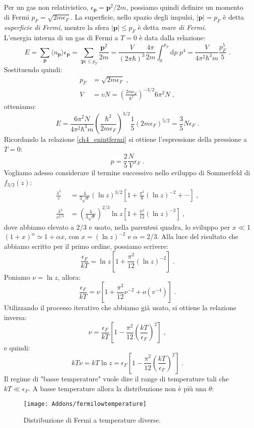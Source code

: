 \documentclass[10pt,a4paper]{report}
\theoremstyle{definition}
\numberwithin{equation}{section}
\newcommand{\diff}[1][]{\mathrm{d}#1}
\newcommand{\bra}{\langle}
\newcommand{\ket}{\rangle}
\begin{document}
Per un gas non relativistico, $\epsilon_{\mathbf{p}}=\mathbf{p}^2/2m$, possiamo quindi definire un momento di Fermi $p_F=\sqrt{2m\epsilon_F}$. La superficie, nello spazio degli impulsi, $|\mathbf{p}|=p_F$ è detta \emph{superficie di Fermi}, mentre la sfera $|\mathbf{p}|\le p_F$ è detta \emph{mare di Fermi}. \\
L'energia interna di un gas di Fermi a $T=0$ è data dalla relazione:
$$
E=\sum_{\mathbf{p}}\bra n_{\mathbf{p}}\ket\epsilon_{\mathbf{p}}=\sum_{|\mathbf{p}|\le p_F}\frac{\mathbf{p}^2}{2m}=\frac{V}{(2\pi\hbar)^3}\frac{4\pi}{2m}\int_0^{p_F}\diff{p}\;p^4=\frac{V}{4\pi^2\hbar^3m}\frac{p_F^5}{5}\;.
$$
Sostituendo quindi:
\begin{align*}
p_F&=\sqrt{2m\epsilon_F}\;, \\
V&=vN=\left(\frac{2m\epsilon_F}{\hbar^2}\right)^{-3/2}6\pi^2N\;,
\end{align*}
otteniamo:
\begin{equation}
E=\frac{6\pi^2N}{4\pi^2\hbar^3m}\left(\frac{\hbar^2}{2m\epsilon_F}\right)^{3/2}\frac{1}{5}(2m\epsilon_F)^{5/2}=\frac{3}{5}N\epsilon_F\;.
\end{equation}
Ricordando la relazione \eqref{ch4_enintfermi} si ottiene l'espressione della pressione a $T=0$:
\begin{equation}
p=\frac{2}{5}\frac{N}{V}\epsilon_F\;.
\end{equation}
Vogliamo adesso considerare il termine successivo nello sviluppo di Sommerfeld di $f_{3/2}(z)$:
\begin{align*}
\frac{\lambda^3}{v}&=\frac{4}{3\sqrt{\pi}}(\ln z)^{3/2}\left[1+\frac{\pi^2}{8}(\ln z)^{-2}+\cdots\right]\;, \\
\frac{\lambda^2}{v^{2/3}}&=\left(\frac{4}{3\sqrt{\pi}}\right)^{2/3}\ln z\left[1+\frac{\pi^2}{12}(\ln z)^{-2}\right]\;,
\end{align*}
dove abbiamo elevato a $2/3$ e usato, nella parentesi quadra, lo sviluppo per $x\ll 1$ $(1+x)^{\alpha}\simeq 1+\alpha x$, con $x=(\ln z)^{-2}$ e $\alpha=2/3$. Alla luce del risultato che abbiamo scritto per il primo ordine, possiamo scrivere:
\begin{equation}
\frac{\epsilon_F}{kT}=\ln z\left[1+\frac{\pi^2}{12}(\ln z)^{-2}\right]\;.
\end{equation}
Poniamo $\nu=\ln z$, allora:
$$
\frac{\epsilon_F}{kT}=\nu\left[1+\frac{\pi^2}{12}\nu^{-2}+o(v^{-4})\right]\;.
$$
Utilizzando il processo iterativo che abbiamo già usato, si ottiene la relazione inversa:
\begin{equation}
\nu=\frac{\epsilon_F}{kT}\left[1-\frac{\pi^2}{12}\left(\frac{kT}{\epsilon_F}\right)^2\right]\;, \label{ch4_nu}
\end{equation}
e quindi:
$$
kT\nu=kT\ln z=\epsilon_F\left[1-\frac{\pi^2}{12}\left(\frac{kT}{\epsilon_F}\right)^2\right]\;.
$$
Il regime di "basse temperature" vuole dire il range di temperature tali che $kT\ll \epsilon_F$. A basse temperature allora la distribuzione non è più una $\theta$:
\begin{figure}[h]
\centering
\texttt{[image: Addons/fermilowtemperature]}
\caption{\footnotesize{Distribuzione di Fermi a temperature diverse.}}

\end{figure}
\end{document}
